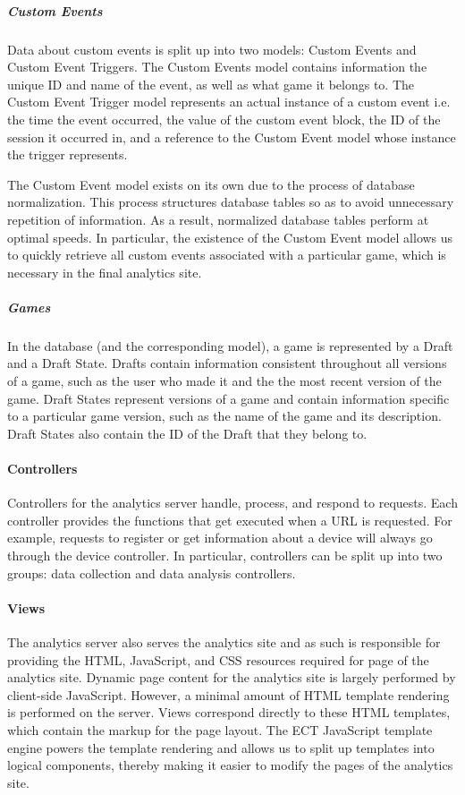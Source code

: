 \subparagraph{Custom Events}
	Data about custom events is split up into two models: Custom Events and Custom Event Triggers. The Custom Events model contains information the unique ID and name of the event, as well as what game it belongs to.
	The Custom Event Trigger model represents an actual instance of a custom event i.e. the time the event occurred, the value of the custom event block, the ID of the session it occurred in, and a reference to the Custom Event model whose instance the trigger represents.

	The Custom Event model exists on its own due to the process of database normalization. This process structures database tables so as to avoid unnecessary repetition of information. As a result, normalized database tables perform at optimal speeds. In particular, the existence of the Custom Event model allows us to quickly retrieve all custom events associated with a particular game, which is necessary in the final analytics site.

\subparagraph{Games}
	In the database (and the corresponding model), a game is represented by a Draft and a Draft State. Drafts contain information consistent throughout all versions of a game, such as the user who made it and the the most recent version of the game. Draft States represent versions of a game and contain information specific to a particular game version, such as the name of the game and its description. Draft States also contain the ID of the Draft that they belong to.

\paragraph{Controllers} 

Controllers for the analytics server handle, process, and respond to requests. Each controller provides the functions that get executed when a URL is requested. For example, requests to register or get information about a device will always go through the device controller. In particular, controllers can be split up into two groups: data collection and data analysis controllers.

\paragraph{Views}

The analytics server also serves the analytics site and as such is responsible for providing the HTML, JavaScript, and CSS resources required for page of the analytics site. Dynamic page content for the analytics site is largely performed by client-side JavaScript. However, a minimal amount of HTML template rendering is performed on the server. Views correspond directly to these HTML templates, which contain the markup for the page layout. The ECT JavaScript template engine powers the template rendering and allows us to split up templates into logical components, thereby making it easier to modify the pages of the analytics site.



